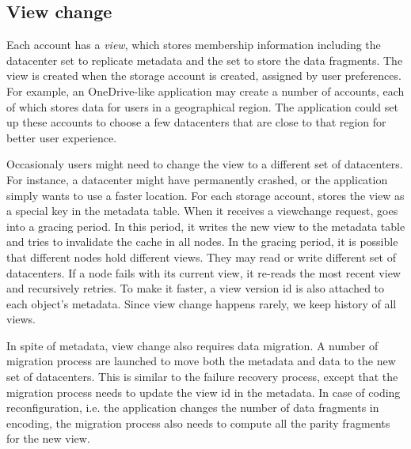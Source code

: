 \subsection{View change}
Each {\name} account has a \emph{view}, which stores membership information
including the datacenter set to replicate metadata and the set to store the
data fragments. The view is created when the storage account is created,
assigned by user preferences. For example, an OneDrive-like application may
create a number of {\name} accounts, each of which stores data for users
in a geographical region. The application could set up these accounts to
choose a few datacenters that are close to that region for better user
experience.

Occasionaly {\name} users might need to change the view to a different set
of datacenters. For instance, a datacenter might have permanently crashed,
or the application simply wants to use a faster location. For each storage
account, {\name} stores the view as a special key in the metadata table.
When it receives a viewchange request, {\name} goes into a gracing period.
In this period, it writes the new view to the metadata table and tries to
invalidate the cache in all {\name} nodes. In the gracing period, it is
possible that different nodes hold different views. They may read or write
different set of datacenters. If a {\name} node fails with its current
view, it re-reads the most recent view and recursively retries. To make it
faster, a view version id is also attached to each object's metadata.
Since view change happens rarely, we keep history of all views.

In spite of metadata, view change also requires data migration. A number
of migration process are launched to move both the metadata and data to
the new set of datacenters. This is similar to the failure recovery process,
except that the migration process needs to update the view id in the
metadata. In case of coding reconfiguration, i.e. the application changes
the number of data fragments in encoding, the migration process also needs
to compute all the parity fragments for the new view.



